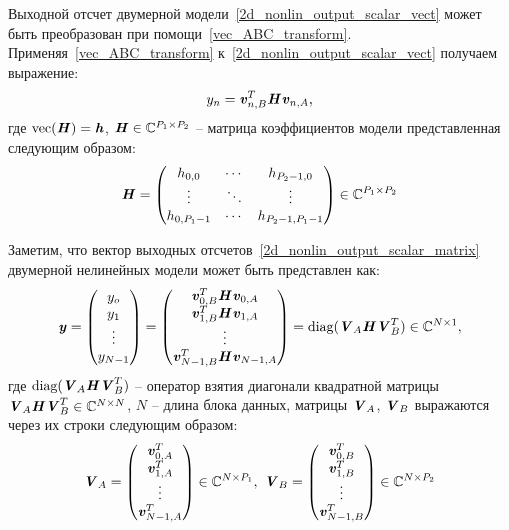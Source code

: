 Выходной отсчет двумерной модели~\eqref{2d_nonlin_output_scalar_vect} может быть преобразован при помощи~\eqref{vec_ABC_transform}. Применяя~\eqref{vec_ABC_transform} к~\eqref{2d_nonlin_output_scalar_vect} получаем выражение:
\begin{equation}
	y_n=\textbf{\textit{v}}_{n, B}^T\textbf{\textit{H}}\textbf{\textit{v}}_{n, A},
	\label{2d_nonlin_output_scalar_matrix}
\end{equation}
где $\text{vec}(\textbf{\textit{H}})=\textbf{\textit{h}}$, $\textbf{\textit{H}}\in\mathbb{C}^{P_1\times P_2}$ -- матрица коэффициентов модели представленная следующим образом:
\begin{equation}
	\textbf{\textit{H}}=\begin{pmatrix}
		h_{0, 0} & \cdots & h_{P_2-1, 0} \\
		\vdots & \ddots & \vdots \\
		h_{0, P_1-1} & \cdots & h_{P_2-1, P_1-1}
	\end{pmatrix}
	\in\mathbb{C}^{P_1\times P_2}
	\label{param_matrix_2d_model}
\end{equation}

Заметим, что вектор выходных отсчетов~\eqref{2d_nonlin_output_scalar_matrix} двумерной нелинейных модели может быть представлен как:
\begin{equation}
	\textbf{\textit{y}}=
	\begin{pmatrix}
		y_o \\ y_1 \\ \vdots \\ y_{N-1}
	\end{pmatrix}=
	\begin{pmatrix}
		\textbf{\textit{v}}_{0, B}^T\textbf{\textit{H}}\textbf{\textit{v}}_{0, A} \\
		\textbf{\textit{v}}_{1, B}^T\textbf{\textit{H}}\textbf{\textit{v}}_{1, A} \\
		\vdots \\
		\textbf{\textit{v}}_{N-1, B}^T\textbf{\textit{H}}\textbf{\textit{v}}_{N-1, A}
	\end{pmatrix}=
	\text{diag}(\textbf{\textit{V}}_A\textbf{\textit{H}}\textbf{\textit{V}}_B^T)\in\mathbb{C}^{N\times1},
	\label{2d_nonlin_output_vector}
\end{equation}
где $\text{diag}(\textbf{\textit{V}}_A\textbf{\textit{H}}\textbf{\textit{V}}_B^T)$ -- оператор взятия диагонали квадратной матрицы $\textbf{\textit{V}}_A\textbf{\textit{H}}\textbf{\textit{V}}_B^T\in\mathbb{C}^{N\times N}$, $N$ -- длина блока данных, матрицы $\textbf{\textit{V}}_A$, $\textbf{\textit{V}}_B$ выражаются через их строки следующим образом:
\begin{equation}
	\textbf{\textit{V}}_A=\begin{pmatrix}
		\textbf{\textit{v}}_{0, A}^T \\
		\textbf{\textit{v}}_{1, A}^T \\
		\vdots \\
		\textbf{\textit{v}}_{N-1, A}^T
	\end{pmatrix}\in\mathbb{C}^{N\times P_1},
	\text{		}
	\textbf{\textit{V}}_B=\begin{pmatrix}
		\textbf{\textit{v}}_{0, B}^T \\
		\textbf{\textit{v}}_{1, B}^T \\
		\vdots \\
		\textbf{\textit{v}}_{N-1, B}^T
	\end{pmatrix}\in\mathbb{C}^{N\times P_2}
	\label{V_AB_matrix}
\end{equation}

